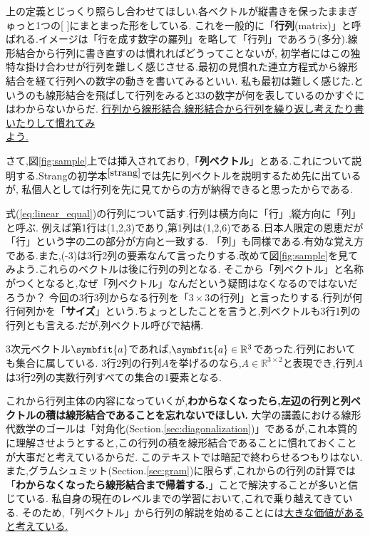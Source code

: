 上の定義とじっくり照らし合わせてほしい.各ベクトルが縦書きを保ったままぎゅっと1つの[ \quad ]にまとまった形をしている.
これを一般的に「\textbf{行列}(matrix)」と呼ばれる.イメージは「行を成す数字の羅列」を略して「行列」であろう(多分).線形結合から行列に書き直すのは慣れればどうってことないが,
初学者にはこの独特な掛け合わせが行列を難しく感じさせる.最初の見慣れた連立方程式から線形結合を経て行列への数字の動きを書いてみるといい.
私も最初は難しく感じた.というのも線形結合を飛ばして行列をみると3\times 3の数字が何を表しているのかすぐにはわからないからだ.
\underline{行列から線形結合.線形結合から行列を繰り返し考えたり書いたりして慣れてみ}\\\underline{よう.}

さて,図\ref{fig:sample}上では挿入されており,「\textbf{列ベクトル}」とある.これについて説明する.Strangの初学本$^{\cite{strang}}$では先に列ベクトルを説明するため先に出ているが,
私個人としては行列を先に見てからの方が納得できると思ったからである.

式(\ref{eq:linear_equal})の行列について話す.行列は横方向に「行」,縦方向に「列」と呼ぶ.
例えば第1行は(1,2,3)であり,第1列は(1,2,6)である.日本人限定の恩恵だが「行」という字の二の部分が方向と一致する.
「列」も同様である.有効な覚え方である.また,(-3)は3行2列の要素なんて言ったりする.改めて図\ref{fig:sample}を見てみよう.これらのベクトルは後に行列の列となる.
そこから「列ベクトル」と名称がつくとなると,なぜ「列ベクトル」なんだという疑問はなくなるのではないだろうか？
今回の3行3列からなる行列を「$3\times3$の行列」と言ったりする.行列が何行何列かを「\hypertarget{size}{\textbf{サイズ}}」という.ちょっとしたことを言うと,列ベクトルも3行1列の行列とも言える.だが,列ベクトル呼びで結構.

3次元ベクトル$\symbfit{a}$であれば,$\symbfit{a} \in \mathbb{R}^3$であった.行列においても集合に属している.
3行2列の行列$A$を挙げるのなら,$A\in \mathbb{R}^{3\times2}$と表現でき,行列$A$は3行2列の実数行列すべての集合の1要素となる.

これから行列主体の内容になっていくが,\textbf{わからなくなったら,左辺の行列と列ベクトルの積は線形結合であることを忘れないでほしい.}
大学の講義における線形代数学のゴールは「対角化(Section.\ref{sec:diagonalization})」であるが,これ本質的に理解させようとすると,この行列の積を線形結合であることに慣れておくことが大事だと考えているからだ.
このテキストでは暗記で終わらせるつもりはない.また,グラムシュミット(Section.\ref{sec:gram})に限らず,これからの行列の計算では「\textbf{わからなくなったら線形結合まで帰着する.}」ことで解決することが多いと信じている.
私自身の現在のレベルまでの学習において,これで乗り越えてきている.
そのため,「列ベクトル」から行列の解説を始めることには\underline{大きな価値があると考えている.}
\newpage
